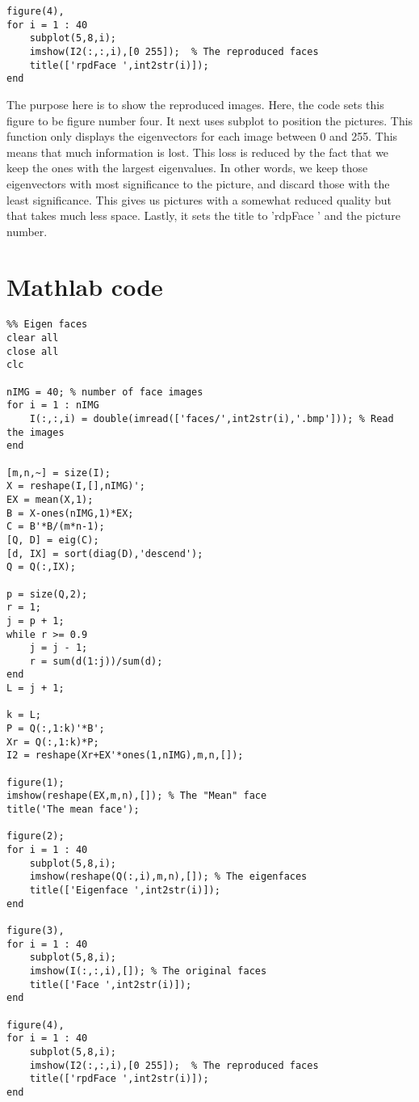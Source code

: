 \documentclass{article}
\begin{document}
\begin{verbatim}
figure(4),
for i = 1 : 40
    subplot(5,8,i);
    imshow(I2(:,:,i),[0 255]);  % The reproduced faces
    title(['rpdFace ',int2str(i)]);
end
\end{verbatim}
The purpose here is to show the reproduced images.
Here, the code sets this figure to be figure number four.
It next uses subplot to position the pictures. 
This function only displays the eigenvectors for each image between 0 and 255. This means
that much information is lost. This loss is reduced by the fact that we keep the ones with
the largest eigenvalues. In other words, we keep those eigenvectors with most significance
to the picture, and discard those with the least significance. This gives us pictures with a
somewhat reduced quality but that takes much less space.
Lastly, it sets the title to 'rdpFace ' and the picture number.
\vspace{10pt}




\section{Mathlab code}
\begin{verbatim}
%% Eigen faces
clear all
close all
clc

nIMG = 40; % number of face images
for i = 1 : nIMG
    I(:,:,i) = double(imread(['faces/',int2str(i),'.bmp'])); % Read the images
end

[m,n,~] = size(I);
X = reshape(I,[],nIMG)';
EX = mean(X,1);
B = X-ones(nIMG,1)*EX;
C = B'*B/(m*n-1);
[Q, D] = eig(C);
[d, IX] = sort(diag(D),'descend');
Q = Q(:,IX);

p = size(Q,2);
r = 1;
j = p + 1;
while r >= 0.9
    j = j - 1;
    r = sum(d(1:j))/sum(d);
end
L = j + 1;

k = L;
P = Q(:,1:k)'*B';
Xr = Q(:,1:k)*P;
I2 = reshape(Xr+EX'*ones(1,nIMG),m,n,[]);

figure(1);
imshow(reshape(EX,m,n),[]); % The "Mean" face
title('The mean face');

figure(2);
for i = 1 : 40
    subplot(5,8,i);
    imshow(reshape(Q(:,i),m,n),[]); % The eigenfaces
    title(['Eigenface ',int2str(i)]);
end

figure(3),
for i = 1 : 40
    subplot(5,8,i);
    imshow(I(:,:,i),[]); % The original faces
    title(['Face ',int2str(i)]);
end

figure(4),
for i = 1 : 40
    subplot(5,8,i);
    imshow(I2(:,:,i),[0 255]);  % The reproduced faces
    title(['rpdFace ',int2str(i)]);
end   
\end{verbatim}
\end{document}
